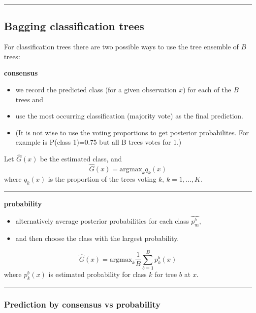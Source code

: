 \documentclass[
  letterpaper,
  DIV=11,
  numbers=noendperiod]{scrartcl}
\providecommand{\tightlist}{%
  \setlength{\itemsep}{0pt}\setlength{\parskip}{0pt}}\usepackage{longtable,booktabs,array}
\begin{document}
\begin{center}\rule{0.5\linewidth}{0.5pt}\end{center}

\hypertarget{bagging-classification-trees}{%
\subsection{Bagging classification
trees}\label{bagging-classification-trees}}

For classification trees there are two possible ways to use the tree
ensemble of \(B\) trees:

\textbf{consensus}

\begin{itemize}
\tightlist
\item
  we record the predicted class (for a given observation \(x\)) for each
  of the \(B\) trees and
\item
  use the most occurring classification (majority vote) as the final
  prediction.
\item
  (It is not wise to use the voting proportions to get posterior
  probabilites. For example is P(class 1)=0.75 but all B trees votes for
  1.)
\end{itemize}

Let \(\hat{G}(x)\) be the estimated class, and
\[\hat{G}(x)=\text{argmax}_k q_k(x)\] where \(q_k(x)\) is the proportion
of the trees voting \(k\), \(k=1,\ldots,K\).

\begin{center}\rule{0.5\linewidth}{0.5pt}\end{center}

\textbf{probability}

\begin{itemize}
\tightlist
\item
  alternatively average posterior probabilities for each class
  \(\hat{p_m^b}\),
\item
  and then choose the class with the largest probability.
\end{itemize}

\[\hat{G}(x)=\text{argmax}_k \frac{1}{B} \sum_{b=1}^B p^b_k(x)\] where
\(p^b_k(x)\) is estimated probability for class \(k\) for tree \(b\) at
\(x\).

\begin{center}\rule{0.5\linewidth}{0.5pt}\end{center}

\hypertarget{prediction-by-consensus-vs-probability}{%
\subsubsection{Prediction by consensus vs
probability}\label{prediction-by-consensus-vs-probability}}
\end{document}
